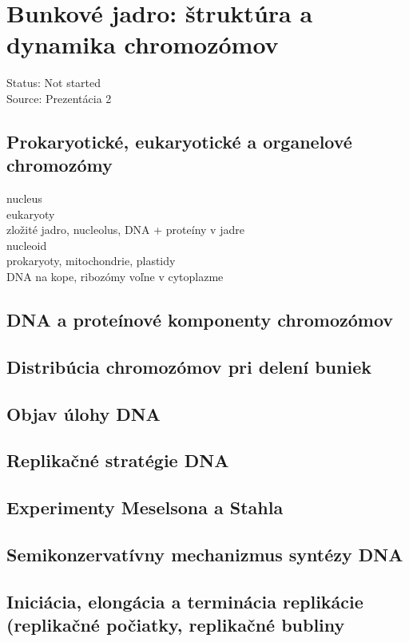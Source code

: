 \section{Bunkové jadro: štruktúra a dynamika chromozómov}
Status: Not started\\
Source: Prezentácia 2\\

\subsection*{Prokaryotické, eukaryotické a organelové chromozómy}
nucleus\\
\tab eukaryoty\\
\tab zložité jadro, nucleolus, DNA + proteíny v jadre\\
nucleoid\\
\tab prokaryoty, mitochondrie, plastidy\\
\tab DNA na kope, ribozómy voľne v cytoplazme\\

\subsection*{DNA a proteínové komponenty chromozómov}

\subsection*{Distribúcia chromozómov pri delení buniek}

\subsection*{Objav úlohy DNA}

\subsection*{Replikačné stratégie DNA}

\subsection*{Experimenty Meselsona a Stahla}

\subsection*{Semikonzervatívny mechanizmus syntézy DNA}

\subsection*{Iniciácia, elongácia a terminácia replikácie (replikačné počiatky, replikačné bubliny}

